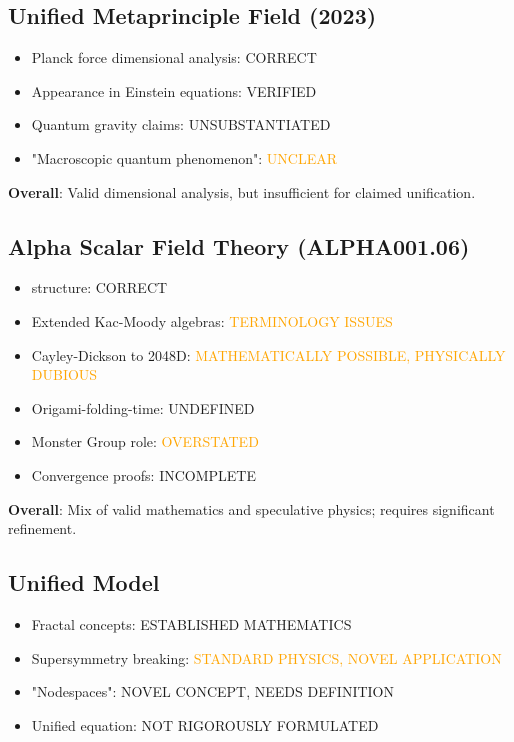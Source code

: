 \subsection{Unified Metaprinciple Field (2023)}

\begin{itemize}
    \item[+] Planck force dimensional analysis: \textcolor{validcolor}{CORRECT}
    \item[+] Appearance in Einstein equations: \textcolor{validcolor}{VERIFIED}
    \item[-] Quantum gravity claims: \textcolor{claimcolor}{UNSUBSTANTIATED}
    \item[-] "Macroscopic quantum phenomenon": \textcolor{orange}{UNCLEAR}
\end{itemize}

\textbf{Overall}: Valid dimensional analysis, but insufficient for claimed unification.

\subsection{Alpha Scalar Field Theory (ALPHA001.06)}

\begin{itemize}
    \item[+]  structure: \textcolor{validcolor}{CORRECT}
    \item[~] Extended Kac-Moody algebras: \textcolor{orange}{TERMINOLOGY ISSUES}
    \item[~] Cayley-Dickson to 2048D: \textcolor{orange}{MATHEMATICALLY POSSIBLE, PHYSICALLY DUBIOUS}
    \item[-] Origami-folding-time: \textcolor{claimcolor}{UNDEFINED}
    \item[-] Monster Group role: \textcolor{orange}{OVERSTATED}
    \item[-] Convergence proofs: \textcolor{claimcolor}{INCOMPLETE}
\end{itemize}

\textbf{Overall}: Mix of valid mathematics and speculative physics; requires significant refinement.

\subsection{Unified Model}

\begin{itemize}
    \item[+] Fractal concepts: \textcolor{validcolor}{ESTABLISHED MATHEMATICS}
    \item[~] Supersymmetry breaking: \textcolor{orange}{STANDARD PHYSICS, NOVEL APPLICATION}
    \item[-] "Nodespaces": \textcolor{claimcolor}{NOVEL CONCEPT, NEEDS DEFINITION}
    \item[-] Unified equation: \textcolor{claimcolor}{NOT RIGOROUSLY FORMULATED}
\end{itemize}

